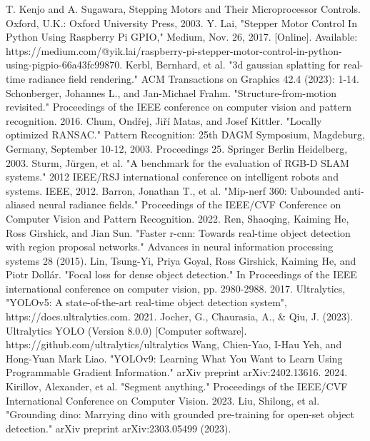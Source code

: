 \documentclass[conference]{IEEEtran}
\begin{document}
\begin{thebibliography}{00}
 T. Kenjo and A. Sugawara, Stepping Motors and Their Microprocessor Controls. Oxford, U.K.: Oxford University Press, 2003.
  Y. Lai, "Stepper Motor Control In Python Using Raspberry Pi GPIO," Medium, Nov. 26, 2017. [Online]. Available: https://medium.com/@yik.lai/raspberry-pi-stepper-motor-control-in-python-using-pigpio-66a43fc99870. 
 Kerbl, Bernhard, et al. "3d gaussian splatting for real-time radiance field rendering." ACM Transactions on Graphics 42.4 (2023): 1-14.
Schonberger, Johannes L., and Jan-Michael Frahm. "Structure-from-motion revisited." Proceedings of the IEEE conference on computer vision and pattern recognition. 2016.
Chum, Ondřej, Jiří Matas, and Josef Kittler. "Locally optimized RANSAC." Pattern Recognition: 25th DAGM Symposium, Magdeburg, Germany, September 10-12, 2003. Proceedings 25. Springer Berlin Heidelberg, 2003.
Sturm, Jürgen, et al. "A benchmark for the evaluation of RGB-D SLAM systems." 2012 IEEE/RSJ international conference on intelligent robots and systems. IEEE, 2012.
Barron, Jonathan T., et al. "Mip-nerf 360: Unbounded anti-aliased neural radiance fields." Proceedings of the IEEE/CVF Conference on Computer Vision and Pattern Recognition. 2022.
Ren, Shaoqing, Kaiming He, Ross Girshick, and Jian Sun. "Faster r-cnn: Towards real-time object detection with region proposal networks." Advances in neural information processing systems 28 (2015).
Lin, Tsung-Yi, Priya Goyal, Ross Girshick, Kaiming He, and Piotr Dollár. "Focal loss for dense object detection." In Proceedings of the IEEE international conference on computer vision, pp. 2980-2988. 2017.
Ultralytics, "YOLOv5: A state-of-the-art real-time object detection system", https://docs.ultralytics.com. 2021.
Jocher, G., Chaurasia, A., & Qiu, J. (2023). Ultralytics YOLO (Version 8.0.0) [Computer software]. https://github.com/ultralytics/ultralytics
Wang, Chien-Yao, I-Hau Yeh, and Hong-Yuan Mark Liao. "YOLOv9: Learning What You Want to Learn Using Programmable Gradient Information." arXiv preprint arXiv:2402.13616. 2024.
Kirillov, Alexander, et al. "Segment anything." Proceedings of the IEEE/CVF International Conference on Computer Vision. 2023.
Liu, Shilong, et al. "Grounding dino: Marrying dino with grounded pre-training for open-set object detection." arXiv preprint arXiv:2303.05499 (2023).
\end{thebibliography}
\vspace{12pt}
\end{document}
